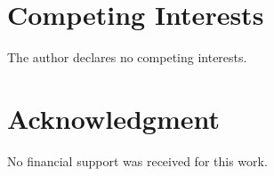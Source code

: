 \section*{Competing Interests}

The author declares no competing interests.

\section*{Acknowledgment}

No financial support was received for this work.



